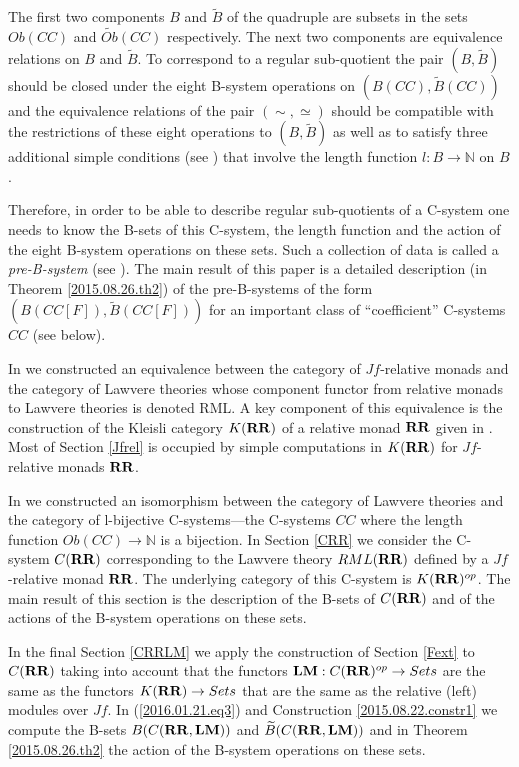 \documentclass[onecolumn,12pt]{amsart}
\newcommand{\DG}[1]{}
\renewcommand{\DG}[1]{\todo[color=green!30]{DG: #1}\PackageWarning{TODO}{DG: #1}}
\numberwithin{proposition}{subsection}
\newcommand{\sr}{\rightarrow}
\newcommand{\nn}{{\mathbb N}}
\newcommand{\nat}{\nn}
\newcommand{\wt}{\widetilde}
\newcommand{\RR}{{\bf RR}}
\newcommand{\LM}{{\bf LM}}
\begin{document}
The first two components $B$ and $\wt{B}$ of the quadruple are subsets in the
sets $Ob(CC)$ and $\wt{Ob}(CC)$ respectively. The next two components are
equivalence relations on $B$ and $\wt{B}$. To correspond to a regular
sub-quotient the pair $(B,\wt{B})$ should be closed under the eight B-system
operations on $(B(CC),\wt{B}(CC))$ and the equivalence relations of the pair
$(\sim,\simeq)$ should be compatible with the restrictions of these eight
operations to $(B,\wt{B})$ as well as to satisfy three additional simple
conditions %
(see \cite[Proposition 5.4]{Csubsystems}) that involve the length
function $l:B\sr\nat$ on $B$.

Therefore, in order to be able to describe regular sub-quotients of a C-system
one needs to know the B-sets of this C-system, the length function and the
action of the eight B-system operations on these sets. Such a collection of
data is called a {\em pre-B-system} (see \cite{Bsystems}).  The main result of this
paper is a detailed description (in Theorem \ref{2015.08.26.th2}) of the pre-B-systems of the form
$(B(CC[F]),\wt{B}(CC[F]))$ for an important class of ``coefficient''
C-systems $CC$ (see below).

In \cite{LandJf} we constructed an equivalence between the category of
$Jf$-relative monads and the category of Lawvere theories whose component
functor from relative monads to Lawvere theories is denoted \gls{RML}. A key
component of this equivalence is the construction of the Kleisli category
$K(\RR)$ of a relative monad $\RR$ given in \cite{ACU2}.  Most of Section
\ref{Jfrel} is occupied by simple computations in $K(\RR)$ for $Jf$-relative
monads $\RR$.

In \cite{LandC} we constructed an isomorphism between the category of Lawvere
theories and the category of l-bijective C-systems---the C-systems $CC$ where
the length function $Ob(CC)\sr \nat$ is a bijection. In Section \ref{CRR} we
consider the C-system $C(\RR)$ corresponding to the Lawvere theory $RML(\RR)$
defined by a $Jf$-relative monad $\RR$. The underlying category of this
C-system is $K(\RR)^{op}$. The main result of this section is the description
of the B-sets of $C(\RR)$ and of the actions of the B-system operations on these
sets.

In the final Section \ref{CRRLM} we apply the construction of Section
\ref{Fext} to $C(\RR)$ taking into account that the functors
$\LM:C(\RR)^{op}\sr Sets$ are the same as the functors $K(\RR)\sr Sets$ that
are the same as the relative (left) modules over $Jf$. In
(\ref{2016.01.21.eq3}) and Construction \ref{2015.08.22.constr1} we compute the
B-sets $B(C(\RR,\LM))$ and $\wt{B}(C(\RR,\LM))$ and in Theorem
\ref{2015.08.26.th2} the action of the B-system operations on these sets.
\end{document}
